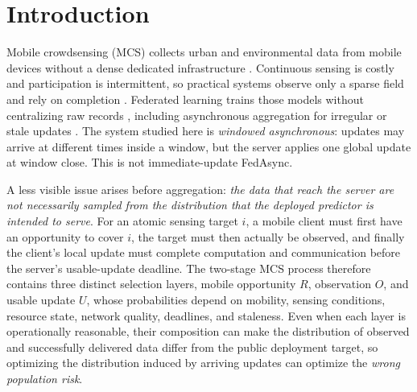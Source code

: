 \documentclass[letterpaper,journal]{IEEEtran}
\begin{document}
\section{Introduction}
\label{sec:introduction}

Mobile crowdsensing (MCS) collects urban and environmental data from mobile
devices without a dense dedicated infrastructure
\cite{ganti2011mobile,guo2015mobile,ma2014opportunities}.
Continuous sensing is costly and participation is intermittent, so practical
systems observe only a sparse field and rely on completion
\cite{wang2023outlier,li2024robust,wang2023transformer,wang2024fewshot,wang2025evolutionary,xu2025rethinking,liu2026pyramid,zhang2026mapt}.
Federated learning trains those models without centralizing raw records
\cite{mcmahan2017communication,yang2019federated,kairouz2021advances,li2020federated},
including asynchronous aggregation for irregular or stale updates
\cite{wang2026federated,xie2019asynchronous,liu2023adaptive,sun2024staleness}.
The system studied here is \emph{windowed asynchronous}: updates may arrive at
different times inside a window, but the server applies one global update at
window close.  This is not immediate-update FedAsync.

A less visible issue arises before aggregation: \emph{the data that reach the
server are not necessarily sampled from the distribution that the deployed
predictor is intended to serve}.  For an atomic sensing target $i$, a mobile
client must first have an opportunity to cover $i$, the target must then actually
be observed, and finally the client's local update must complete computation and
communication before the server's usable-update deadline.  The two-stage MCS
process therefore contains three distinct selection layers, mobile opportunity
$R$, observation $O$, and usable update $U$, whose probabilities depend on
mobility, sensing conditions, resource state, network quality, deadlines, and
staleness.  Even when each layer is operationally reasonable, their composition
can make the distribution of observed and successfully delivered data differ
from the public deployment target, so optimizing the distribution induced by
arriving updates can optimize the \emph{wrong population risk}.
\end{document}

